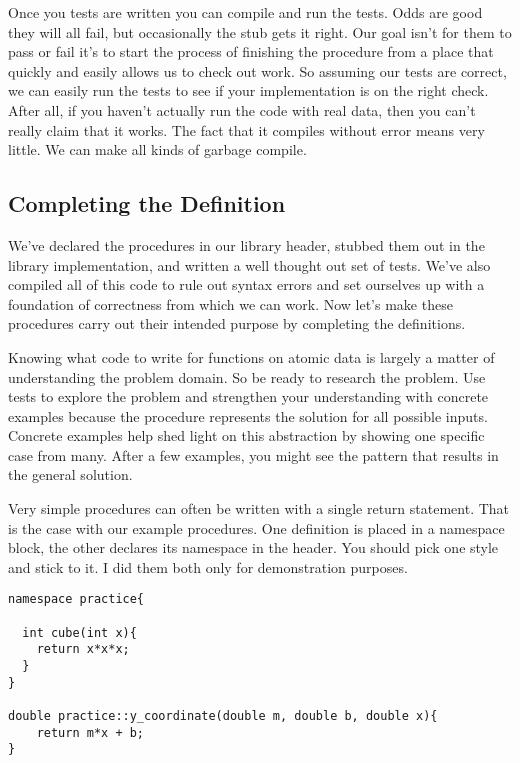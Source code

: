 \documentclass[]{tufte-handout}
\begin{document}
Once you tests are written you can compile and run the tests.  Odds are good they will all fail, but occasionally the stub gets it right. Our goal isn't for them to pass or fail it's to start the process of finishing the procedure from a place that quickly and easily allows us to check out work. So assuming our tests are correct, we can easily run the tests to see if your implementation is on the right check. After all, if you haven't actually run the code with real data, then you can't really claim that it works. The fact that it compiles without error means very little. We can make all kinds of garbage compile.

\subsection{Completing the Definition}

We've declared the procedures in our library header, stubbed them out in the library implementation, and written a well thought out set of tests. We've also compiled all of this code to rule out syntax errors and set ourselves up with a foundation of correctness from which we can work.  Now let's make these procedures carry out their intended purpose by completing the definitions.

Knowing what code to write for functions on atomic data is largely a matter of understanding the problem domain. So be ready to research the problem. Use tests to explore the problem and strengthen your understanding with concrete examples because the procedure represents the solution for all possible inputs. Concrete examples help shed light on this abstraction by showing one specific case from many. After a few examples, you might see the pattern that results in the general solution. 

Very simple procedures can often be written with a single return statement. That is the case with our example procedures.  One definition is placed in a namespace block, the other declares its namespace in the header. You should pick one style and stick to it. I did them both only for demonstration purposes.

\begin{verbatim}
namespace practice{

  int cube(int x){
    return x*x*x;  
  }
}

double practice::y_coordinate(double m, double b, double x){
    return m*x + b;
}

\end{verbatim}
\end{document}
